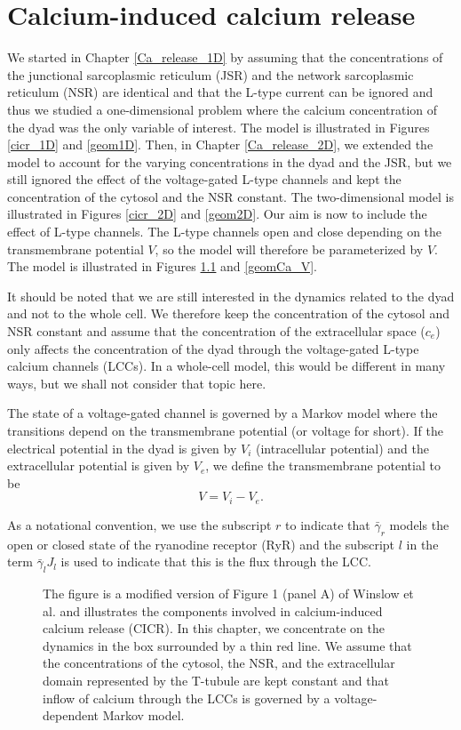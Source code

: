 
\chapter{Calcium-induced calcium release}
\label{cicr}



We started in Chapter \ref{Ca_release_1D} by assuming that the concentrations of the junctional sarcoplasmic reticulum (JSR) and the network sarcoplasmic reticulum (NSR) are identical and that the L-type current can be ignored and thus we studied a one-dimensional problem where the calcium concentration of the dyad was the only variable of interest. The model is illustrated in Figures \ref{cicr_1D} and \ref{geom1D}. Then, in Chapter  \ref{Ca_release_2D}, we extended the model to account for the varying concentrations in the dyad and the JSR, but we still ignored the effect of the voltage-gated L-type channels and kept the concentration of the cytosol and the NSR constant. The two-dimensional model is illustrated in Figures \ref{cicr_2D} and \ref{geom2D}. Our aim is now to include the effect of L-type channels. The L-type channels open and close depending on the transmembrane potential $V$, so the model will therefore be parameterized by $V$. The model is illustrated in Figures \ref{cicr_2D_V} and \ref{geomCa_V}.

It should be noted that we are still interested in the dynamics related to the dyad and not to the whole cell. We therefore keep the concentration of the cytosol and NSR constant and assume that the concentration of the extracellular space ($c_e$) only affects the concentration of the dyad through the voltage-gated L-type calcium channels (LCCs). In a whole-cell model, this would be different in many ways, but we shall not consider that topic here.

The state of a voltage-gated channel is governed by a Markov model where the transitions depend on the transmembrane potential (or voltage for short). If the electrical potential in the dyad is given by $V_{i}$
(intracellular potential) and the extracellular potential is given by $V_{e}
$, we define the transmembrane potential to be
\[
V=V_{i}-V_{e}.
\]

As a notational convention, we use the subscript $r$ to indicate that $\bar
{\gamma}_{r}$ models the open or closed state of the ryanodine receptor (RyR)
and the subscript $l$ in the term $\bar{\gamma}_{l}J_{l}$ is used to indicate
that this is the flux through the LCC.

\begin{figure}
\centering{}
\caption{The figure is a modified version of Figure 1 (panel A) of Winslow et
al. \cite{winslow2006} and illustrates the components involved in calcium-induced calcium release (CICR). In this chapter, we concentrate on the dynamics in the box surrounded by a thin red line. We assume that the concentrations of the cytosol, the NSR, and the extracellular domain
represented by the T-tubule are kept constant and that inflow of calcium through the LCCs is governed by a voltage-dependent Markov model.
 \label{cicr_2D_V}}
\end{figure}


